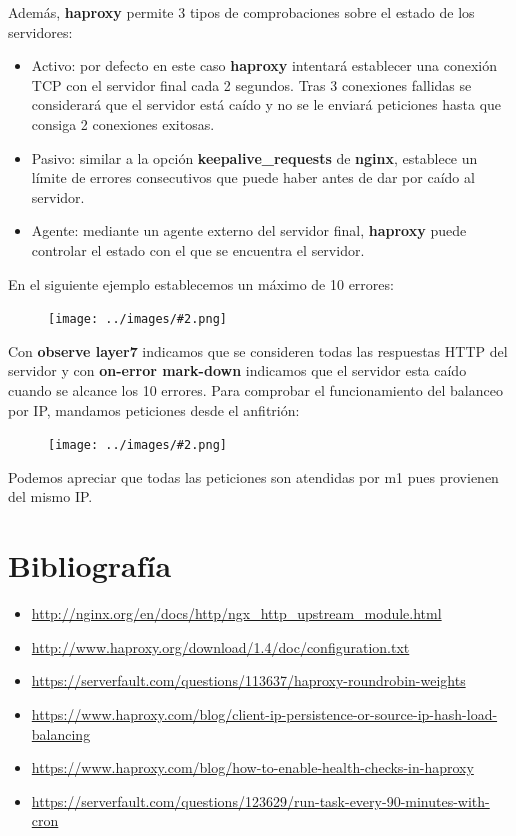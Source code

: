 \documentclass[twoside]{article}
\newcommand{\image}[2]{
\begin{figure}[H]
    \texttt{[image: ../images/\#2.png]}
    \centering
\end{figure}
}
\begin{document}
Además, \textbf{haproxy} permite 3 tipos de comprobaciones sobre el estado de los servidores:
\begin{itemize}
    \item Activo: por defecto en este caso \textbf{haproxy} intentará establecer una conexión TCP con el servidor final cada 2 segundos. Tras 3 conexiones fallidas se considerará que el servidor está caído y no se le enviará peticiones hasta que consiga 2 conexiones exitosas.
    \item Pasivo: similar a la opción \textbf{keepalive\_requests} de \textbf{nginx}, establece un límite de errores consecutivos que puede haber antes de dar por caído al servidor.
    \item Agente: mediante un agente externo del servidor final, \textbf{haproxy} puede controlar el estado con el que se encuentra el servidor.
\end{itemize}
En el siguiente ejemplo establecemos un máximo de 10 errores:
\image{8}{21}
Con \textbf{observe layer7} indicamos que se consideren todas las respuestas HTTP del servidor y con \textbf{on-error mark-down} indicamos que el servidor esta caído cuando se alcance los 10 errores.
Para comprobar el funcionamiento del balanceo por IP, mandamos peticiones desde el anfitrión:
\image{6}{22}
Podemos apreciar que todas las peticiones son atendidas por m1 pues provienen del mismo IP.



\newpage
\section{Bibliografía}
\begin{itemize}
    \item \url{http://nginx.org/en/docs/http/ngx_http_upstream_module.html}
    \item \url{http://www.haproxy.org/download/1.4/doc/configuration.txt}
    \item \url{https://serverfault.com/questions/113637/haproxy-roundrobin-weights}
    \item \url{https://www.haproxy.com/blog/client-ip-persistence-or-source-ip-hash-load-balancing}
    \item \url{https://www.haproxy.com/blog/how-to-enable-health-checks-in-haproxy}
    

    \item \url{https://serverfault.com/questions/123629/run-task-every-90-minutes-with-cron}
\end{itemize}
\end{document}
